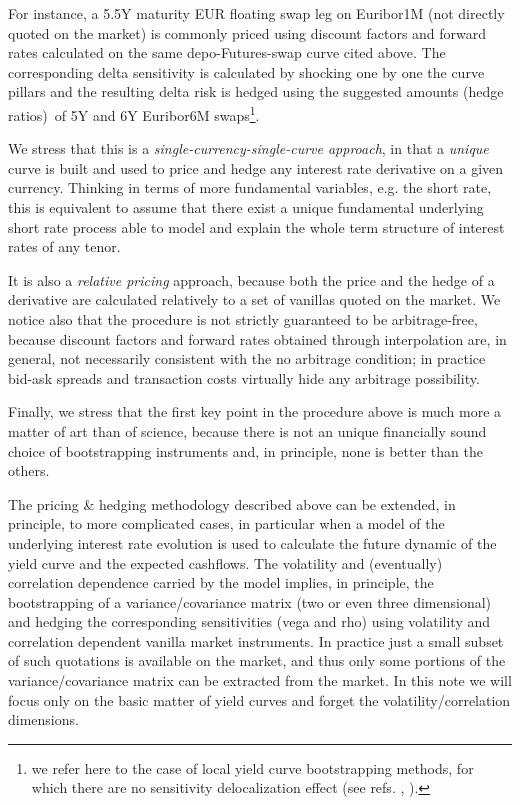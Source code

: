 \documentclass[11pt,reqno]{amsart}
\begin{document}
For instance, a 5.5Y maturity EUR floating swap leg on Euribor1M (not directly quoted on the market) is commonly priced using discount factors and forward rates calculated on the same depo-Futures-swap curve cited above. The corresponding delta sensitivity is calculated by shocking one by one the curve pillars and the resulting delta risk is hedged using the suggested amounts (hedge ratios)\ of 5Y and 6Y Euribor6M swaps\footnote{we refer here to the case of local yield curve bootstrapping methods, for which there are no sensitivity delocalization effect (see refs. \cite{HaganWest2008}, \cite{HaganWest2006}).}.

We stress that this is a \textit{single-currency-single-curve approach}, in that a \textit{unique} curve is built and used to price and hedge any interest rate derivative on a given currency. Thinking in terms of more fundamental variables, e.g. the short rate, this is equivalent to assume that there exist a unique fundamental underlying short rate process able to model and explain the whole term structure of interest rates of any tenor.

It is also a \textit{relative pricing} approach, because both the price and the hedge of a derivative are calculated relatively to a set of vanillas quoted on the market. We notice also that the procedure is not strictly guaranteed to be arbitrage-free, because discount factors and forward rates obtained through interpolation are, in general, not necessarily consistent with the no arbitrage condition; in practice bid-ask spreads and transaction costs virtually hide any arbitrage possibility.

Finally, we stress that the first key point in the procedure above is much more a matter of art than of science, because there is not an unique financially sound choice of bootstrapping instruments and, in principle, none is better than the others.

The pricing \& hedging methodology described above can be extended, in principle, to more complicated cases, in particular when a model of the underlying interest rate evolution is used to calculate the future dynamic of the yield curve and the expected cashflows. The volatility and (eventually) correlation dependence carried by the model implies, in principle, the bootstrapping of a variance/covariance matrix (two or even three dimensional) and hedging the corresponding sensitivities (vega and rho) using volatility and correlation dependent vanilla market instruments. In practice just a small subset of such quotations is available on the market, and thus only some portions of the variance/covariance matrix can be extracted from the market. In this note we will focus only on the basic matter of yield curves and forget the volatility/correlation dimensions.
\end{document}
